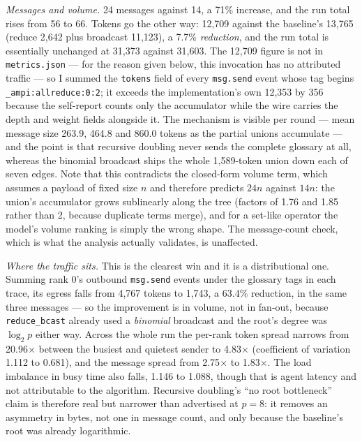 \documentclass[11pt]{article}
\begin{document}
\emph{Messages and volume.} 24 messages against 14, a 71\% increase, and the run total rises from
56 to 66. Tokens go the other way: 12,709 against the baseline's 13,765 (reduce 2,642 plus
broadcast 11,123), a 7.7\% \emph{reduction}, and the run total is essentially unchanged at 31,373
against 31,603. The 12,709 figure is not in \texttt{metrics.json} --- for the reason given below,
this invocation has no attributed traffic --- so I summed the \texttt{tokens} field of every
\texttt{msg.send} event whose tag begins \texttt{\_ampi:allreduce:0:2}; it exceeds the
implementation's own 12,353 by 356 because the self-report counts only the accumulator while the
wire carries the depth and weight fields alongside it. The mechanism is visible per round --- mean
message size 263.9, 464.8 and
860.0 tokens as the partial unions accumulate --- and the point is that recursive doubling never
sends the complete glossary at all, whereas the binomial broadcast ships the whole 1,589-token
union down each of seven edges. Note that this contradicts the closed-form volume term, which
assumes a payload of fixed size $n$ and therefore predicts $24n$ against $14n$: the union's
accumulator grows sublinearly along the tree (factors of 1.76 and 1.85 rather than 2, because
duplicate terms merge), and for a set-like operator the model's volume ranking is simply the wrong
shape. The message-count check, which is what the analysis actually validates, is unaffected.

\emph{Where the traffic sits.} This is the clearest win and it is a distributional one. Summing
rank 0's outbound \texttt{msg.send} events under the glossary tags in each trace, its egress falls
from 4,767 tokens to 1,743, a 63.4\% reduction, in the same three messages
--- so the improvement is in volume, not in fan-out, because \texttt{reduce\_bcast} already used a
\emph{binomial} broadcast and the root's degree was $\log_2 p$ either way. Across the whole run the
per-rank token spread narrows from 20.96$\times$ between the busiest and quietest sender to
4.83$\times$ (coefficient of variation 1.112 to 0.681), and the message spread from 2.75$\times$ to
1.83$\times$. The load imbalance in busy time also falls, 1.146 to 1.088, though that is agent
latency and not attributable to the algorithm. Recursive doubling's ``no root bottleneck'' claim is
therefore real but narrower than advertised at $p=8$: it removes an asymmetry in bytes, not one in
message count, and only because the baseline's root was already logarithmic.
\end{document}
